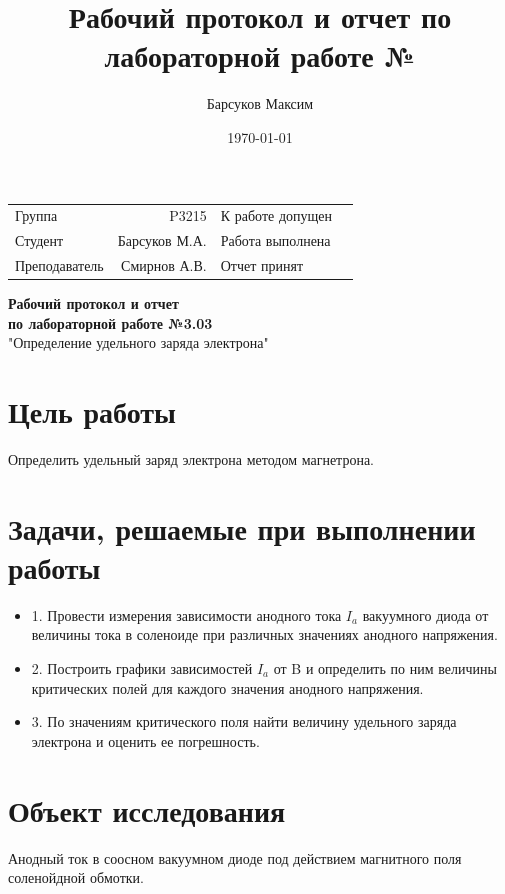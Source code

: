 \documentclass[12pt]{article}
\author{Барсуков Максим}
\title{Рабочий протокол и отчет по лабораторной работе № \\}
\date{\today}
\begin{document}
\begin{table}[htbp]
	\centering
	\begin{tabular}{lrlr}
		Группа & \qquad \qquad P3215 & К работе допущен & \qquad \qquad \qquad \qquad \qquad \qquad \\
		\cmidrule{2-2}\cmidrule{4-4}         
		Студент &  \qquad \qquad Барсуков М.А.  & Работа выполнена & \qquad \qquad \qquad \qquad \qquad \qquad \\
		\cmidrule{2-2}\cmidrule{4-4}          
		Преподаватель & \qquad \qquad Смирнов А.В. & Отчет принят & \qquad \qquad \qquad \qquad \qquad \qquad \\
		\cmidrule{2-2}\cmidrule{4-4}    
	\end{tabular}%
\end{table}%

\begin{center}
    \huge\textbf{Рабочий протокол и отчет\\по лабораторной работе №3.03}\\"Определение удельного заряда электрона"
\end{center}

\section{Цель работы}
Определить удельный заряд электрона методом магнетрона.

\section{Задачи, решаемые при выполнении работы}
\begin{itemize}
\item 1. Провести измерения зависимости анодного тока $I_a$ вакуумного
диода от величины тока в соленоиде при различных значениях анодного напряжения.
\item 2. Построить графики зависимостей $I_a$ от B и определить по ним величины критических полей для каждого значения анодного напряжения.
\item 3. По значениям критического поля найти величину удельного заряда электрона и оценить ее погрешность.
\end{itemize}

\section{Объект исследования}
Анодный ток в соосном вакуумном диоде под действием магнитного поля соленойдной обмотки.
\end{document}
